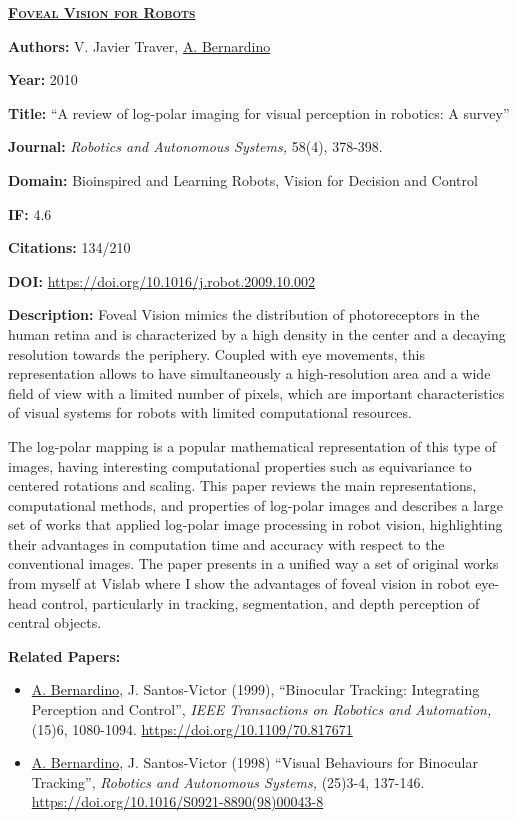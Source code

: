 \clearpage

\textbf{\textsc{\ul{Foveal Vision for Robots}}}

\textbf{Authors:} V. Javier Traver, \ul{A. Bernardino}

\textbf{Year:} 2010

\textbf{Title:} ``A review of log-polar imaging for visual perception in
robotics: A survey''

\textbf{Journal:} \emph{Robotics and Autonomous Systems,} 58(4),
378-398.

\textbf{Domain:} Bioinspired and Learning Robots, Vision for Decision
and Control

\textbf{IF:} 4.6

\textbf{Citations:} 134/210

\textbf{DOI:} \url{https://doi.org/10.1016/j.robot.2009.10.002}

\textbf{Description:} Foveal Vision mimics the distribution of
photoreceptors in the human retina and is characterized by a high
density in the center and a decaying resolution towards the periphery.
Coupled with eye movements, this representation allows to have
simultaneously a high-resolution area and a wide field of view with a
limited number of pixels, which are important characteristics of visual
systems for robots with limited computational resources.

The log-polar mapping is a popular mathematical representation of this
type of images, having interesting computational properties such as
equivariance to centered rotations and scaling. This paper reviews the
main representations, computational methods, and properties of log-polar
images and describes a large set of works that applied log-polar image
processing in robot vision, highlighting their advantages in computation
time and accuracy with respect to the conventional images. The paper
presents in a unified way a set of original works from myself at Vislab
where I show the advantages of foveal vision in robot eye-head control,
particularly in tracking, segmentation, and depth perception of central
objects.

\textbf{Related Papers:}

\begin{itemize}
\item
  \ul{A. Bernardino}, J. Santos-Victor (1999), ``Binocular Tracking:
  Integrating Perception and Control'', \emph{IEEE Transactions on
  Robotics and Automation,} (15)6, 1080-1094.
  \url{https://doi.org/10.1109/70.817671}
\item
  \ul{A. Bernardino}, J. Santos-Victor (1998) ``Visual Behaviours for
  Binocular Tracking'', \emph{Robotics and Autonomous Systems,} (25)3-4,
  137-146. \url{https://doi.org/10.1016/S0921-8890(98)00043-8}
\end{itemize}

